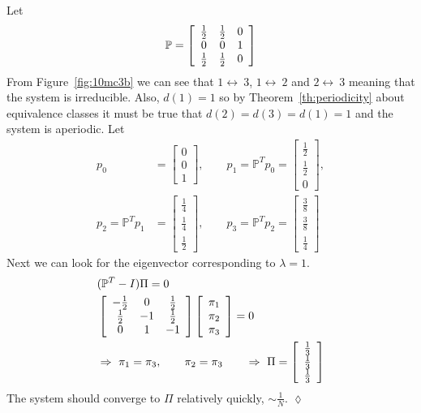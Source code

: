 \begin{example}
Let
$$\mathbb{P} = \left[\begin{array}{c c c} \frac{1}{2} & \frac{1}{2} & 0 \\ 0 & 0 & 1 \\ \frac{1}{2} & \frac{1}{2} & 0 \end{array}\right]$$
From Figure~\ref{fig:10mc3b} we can see that $1\leftrightarrow~3$, $1\leftrightarrow~2$ and $2\leftrightarrow~3$ meaning that the system is irreducible.
Also, $d (1)=1$ so by Theorem~\ref{th:periodicity} about equivalence classes it must be true that $d (2)=d (3)=d (1)=1$ and the system is aperiodic.
Let
\begin{align*}
p_0 &= \left[\begin{array}{c} 0 \\ 0 \\ 1 \end{array}\right],
\qquad p_1 = \mathbb{P}^Tp_0 = \left[\begin{array}{c} \frac{1}{2} \\ \frac{1}{2} \\ 0 \end{array}\right], \\
p_2 = \mathbb{P}^Tp_1 &= \left[\begin{array}{c} \frac{1}{4} \\ \frac{1}{4} \\ \frac{1}{2} \end{array}\right],
\qquad p_3 = \mathbb{P}^Tp_2 = \left[\begin{array}{c} \frac{3}{8} \\ \frac{3}{8} \\ \frac{1}{4} \end{array}\right]
\end{align*}
Next we can look for the eigenvector corresponding to $\lambda=1$.
\begin{align*}
&(\mathbb{P}^T-I)\Pi = 0 \\
&\left[\begin{array}{c c c} -\frac{1}{2} & 0 & \frac{1}{2} \\ \frac{1}{2} & -1 & \frac{1}{2} \\ 0 & 1 & -1 \end{array}\right]
\left[\begin{array}{c} \pi_1 \\ \pi_2 \\ \pi_3 \end{array}\right] = 0 \\
&\Rightarrow~\pi_1=\pi_3, \qquad \pi_2=\pi_3 \qquad \Rightarrow~\Pi=\left[\begin{array}{c} \frac{1}{3} \\ \frac{1}{3} \\ \frac{1}{3} \end{array}\right]
\end{align*}
The system should converge to $\Pi$ relatively quickly, $\sim\frac{1}{N}$.
$\lozenge$
\end{example}

